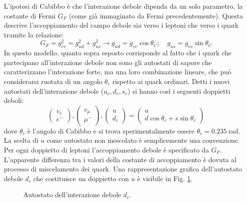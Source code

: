 \documentclass{subnucbo}
\begin{document}
L'ipotesi di Cabibbo è che l'interazione debole dipenda da un solo parametro, la costante di Fermi $G_{F}$ (come già immaginato da Fermi precedentemente). Questa descrive l'accoppiamento del campo debole sia verso i leptoni che verso i quark tramite la relazione:
\begin{equation}
        G _ { F } = g _ { e v } ^ { 2 } = g _ { u d } ^ { 2 } + g _ { u s } ^ { 2 } \longrightarrow g _ { u d } = g _ { e v } \cos \theta _ { C } ; \quad g _ { u s } = g _ { e v } \sin \theta _ { C }
\end{equation}
In questo modello, quanto sopra esposto corrisponde al fatto che i quark che partecipano all'interazione debole non sono gli autostati di sapore che caratterizzano l'interazione forte, ma una loro combinazione lineare, che può considerarsi ruotata di un angolo $\theta_{c}$ rispetto ai quark ordinari. Detti i nuovi autostati dell'interazione debole ($u_{c}, d_{c}, s_{c}$) si hanno così i seguenti doppietti deboli:
\begin{equation}
        \left( \begin{array} { c } { v _ { e } } \\ { e ^ { - } } \end{array} \right) , \left( \begin{array} { c } { v _ { \mu } } \\ { \mu ^ { - } } \end{array} \right) , \left( \begin{array} { c } { u } \\ { d _ { c } } \end{array} \right) = \left( \begin{array} { c } { u } \\ { d \cos \theta _ { c } + s \sin \theta _ { c } } \end{array} \right)
        \label{eq:weak_doublets}
\end{equation}
dove $\theta_{c}$ è l'angolo di Cabibbo e si trova sperimentalmente essere $\theta _ { c } = 0.235\: \mathrm { rad }$. La scelta di $u$ come autostato non mescolato è semplicemente una convenzione. Per ogni doppietto di leptoni l'accoppiamento debole è specificato da $G_{F}$. L'apparente differenza tra i valori della costante di accoppiamento è dovuta al processo di miscelamento dei quark. Una rappresentazione grafica dell'autostato debole $d_{c}$ che costituisce un doppietto con $u$ è visibile in Fig. \ref{fig:dmixing}.\\
\begin{figure}[t]
        \centering
        \caption{Autostato dell'interazione debole $d_{c}$.}
        \label{fig:dmixing}
\end{figure}
\end{document}

